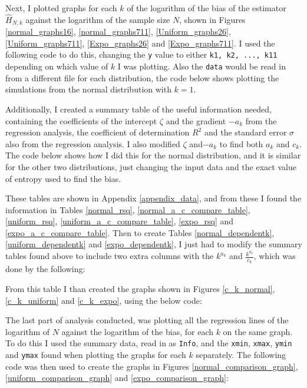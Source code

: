 \documentclass[12pt]{report}
\begin{document}
\begin{appendix}
Next, I plotted graphs for each $k$ of the logarithm of the bias of the estimator $\hat{H}_{N, k}$ against the logarithm of the sample size $N$, shown in Figures \ref{normal_graphs16}, \ref{normal_graphs711}, \ref{Uniform_graphs26}, \ref{Uniform_graphs711}, \ref{Expo_graphs26} and \ref{Expo_graphs711}. I used the following code to do this, changing the \texttt{y} value to either \texttt{k1, k2, ..., k11} depending on which value of $k$ I was plotting. Also the \texttt{data} would be read in from a different file for each distribution, the code below shows plotting the simulations from the normal distribution with $k=1$.



Additionally, I created a summary table of the useful information needed, containing the coefficients of the intercept $\zeta$ and the gradient $-a_{k}$ from the regression analysis, the coefficient of determination $R^2$ and the standard error $\sigma$ also from the regression analysis. I also modified $\zeta$ and$-a_{k}$ to find both $a_{k}$ and $c_{k}$. The code below shows how I did this for the normal distribution, and it is similar for the other two distributions, just changing the input data and the exact value of entropy used to find the bias.



These tables are shown in Appendix \ref{appendix_data}, and from these I found the information in Tables \ref{normal_rsq}, \ref{normal_a_c_compare_table}, \ref{uniform_rsq}, \ref{uniform_a_c_compare_table}, \ref{expo_rsq} and \ref{expo_a_c_compare_table}. Then to create Tables \ref{normal_dependentk}, \ref{uniform_dependentk} and \ref{expo_dependentk}, I just had to modify the summary tables found above to include two extra columns with the $k^{a_{k}}$ and $\frac{k^{a_{k}}}{c_{k}}$, which was done by the following:



From this table I than created the graphs shown in Figures \ref{c_k_normal}, \ref{c_k_uniform} and \ref{c_k_expo}, using the below code:



The last part of analysis conducted, was plotting all the regression lines of the logarithm of $N$ against the logarithm of the bias, for each $k$ on the same graph. To do this I used the summary data, read in as \texttt{Info}, and the \texttt{xmin}, \texttt{xmax}, \texttt{ymin} and \texttt{ymax} found when plotting the graphs for each $k$ separately. The following code was then used to create the graphs in Figures \ref{normal_comparison_graph}, \ref{uniform_comparison_graph} and \ref{expo_comparison_graph}:


\end{appendix}
\end{document}
